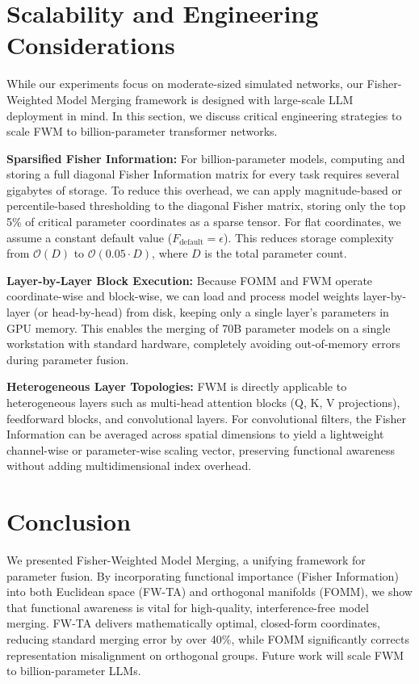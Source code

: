 \documentclass{article}
\theoremstyle{plain}
\theoremstyle{definition}
\theoremstyle{remark}
\begin{document}
\section{Scalability and Engineering Considerations}
\label{sec:scalability}

While our experiments focus on moderate-sized simulated networks, our Fisher-Weighted Model Merging framework is designed with large-scale LLM deployment in mind. In this section, we discuss critical engineering strategies to scale FWM to billion-parameter transformer networks.

\textbf{Sparsified Fisher Information:} For billion-parameter models, computing and storing a full diagonal Fisher Information matrix for every task requires several gigabytes of storage. To reduce this overhead, we can apply magnitude-based or percentile-based thresholding to the diagonal Fisher matrix, storing only the top 5\% of critical parameter coordinates as a sparse tensor. For flat coordinates, we assume a constant default value ($F_{\text{default}} = \epsilon$). This reduces storage complexity from $\mathcal{O}(D)$ to $\mathcal{O}(0.05 \cdot D)$, where $D$ is the total parameter count.

\textbf{Layer-by-Layer Block Execution:} Because FOMM and FWM operate coordinate-wise and block-wise, we can load and process model weights layer-by-layer (or head-by-head) from disk, keeping only a single layer's parameters in GPU memory. This enables the merging of 70B parameter models on a single workstation with standard hardware, completely avoiding out-of-memory errors during parameter fusion.

\textbf{Heterogeneous Layer Topologies:} FWM is directly applicable to heterogeneous layers such as multi-head attention blocks (Q, K, V projections), feedforward blocks, and convolutional layers. For convolutional filters, the Fisher Information can be averaged across spatial dimensions to yield a lightweight channel-wise or parameter-wise scaling vector, preserving functional awareness without adding multidimensional index overhead.

\section{Conclusion}
\label{sec:conclusion}
We presented Fisher-Weighted Model Merging, a unifying framework for parameter fusion. By incorporating functional importance (Fisher Information) into both Euclidean space (FW-TA) and orthogonal manifolds (FOMM), we show that functional awareness is vital for high-quality, interference-free model merging. FW-TA delivers mathematically optimal, closed-form coordinates, reducing standard merging error by over 40\%, while FOMM significantly corrects representation misalignment on orthogonal groups. Future work will scale FWM to billion-parameter LLMs.



\end{document}
